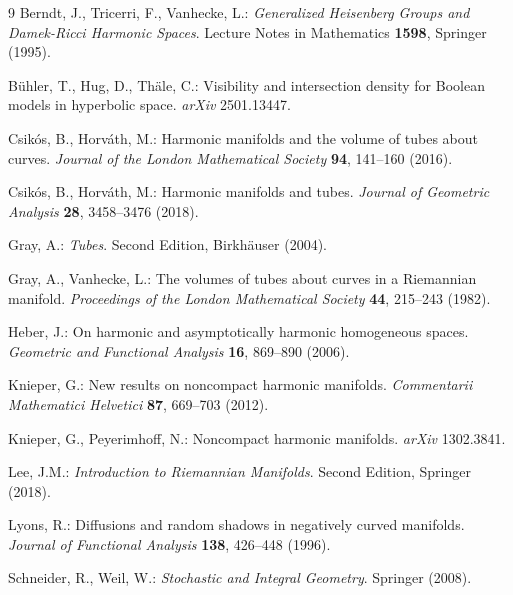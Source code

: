 \documentclass[11pt,a4paper]{article}
\theoremstyle{plain}
\theoremstyle{definition}
\theoremstyle{remark}
\begin{document}
\begin{thebibliography}{9}	
	Berndt, J., Tricerri, F., Vanhecke, L.: \textit{Generalized Heisenberg Groups and Damek-Ricci Harmonic Spaces}. Lecture Notes in Mathematics \textbf{1598},
	Springer (1995).
	
	B\"uhler, T., Hug, D., Th\"ale, C.: Visibility and intersection density for Boolean models in hyperbolic space. \textit{arXiv} 2501.13447.
	
	Csikós, B., Horváth, M.: Harmonic manifolds and the volume of tubes about curves. \textit{Journal of the London Mathematical Society} \textbf{94}, 141--160 (2016).
	
	Csikós, B., Horváth, M.: Harmonic manifolds and tubes. \textit{Journal of Geometric Analysis} \textbf{28}, 3458--3476 (2018).
	
	Gray, A.: \textit{Tubes}. Second Edition, Birkhäuser (2004). 
	
	Gray, A., Vanhecke, L.: The volumes of tubes about curves in a Riemannian manifold. \textit{Proceedings of the London Mathematical Society} \textbf{44}, 215--243 (1982).
	
	Heber, J.: On harmonic and asymptotically harmonic homogeneous spaces. \textit{Geometric and Functional Analysis} \textbf{16}, 869--890 (2006).
	
	Knieper, G.: New results on noncompact harmonic manifolds. \textit{Commentarii Mathematici Helvetici} \textbf{87}, 669--703 (2012).
	
	Knieper, G., Peyerimhoff, N.: Noncompact harmonic manifolds. \textit{arXiv} 1302.3841. 
	
	Lee, J.M.: \textit{Introduction to Riemannian Manifolds}. Second Edition, Springer (2018).
	
	Lyons, R.: Diffusions and random shadows in negatively curved manifolds.
	\textit{Journal of Functional Analysis} \textbf{138}, 426--448 (1996).
	
	Schneider, R., Weil, W.: \textit{Stochastic and Integral Geometry}. Springer (2008).
		
\end{thebibliography}
\end{document}
